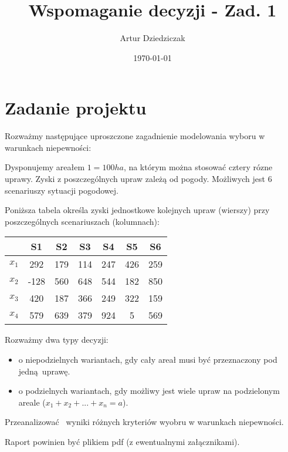 \documentclass{article}
\title{Wspomaganie decyzji - Zad. 1}
\author{Artur Dziedziczak}
\date{\today}
\begin{document}
\maketitle

\newpage

\section{Zadanie projektu}

Rozważmy następujące uproszczone zagadnienie modelowania wyboru w warunkach niepewności:

Dysponujemy areałem $1 = 100ha$, na którym można stosować cztery rózne uprawy. Zyski z poszczególnych upraw zależą od pogody. Możliwych jest 6 scenariuszy sytuacji pogodowej.

Poniższa tabela określa zyski jednostkowe kolejnych upraw (wierszy) przy poszczególnych scenariuszach (kolumnach):

\begin{table}[H]
  \begin{center}
    \begin{tabular}{ c |  c  c   c   c   c   c  }
      & S1 & S2 & S3 & S4 & S5 & S6 \\
      \hline
      $x_1$ & 292 & 179 & 114 & 247 & 426 & 259 \\
      $x_2$ & -128 & 560 & 648 & 544 & 182 & 850 \\
      $x_3$ & 420 & 187 & 366 & 249 & 322 & 159 \\
      $x_4$ & 579 & 639 & 379 & 924 & 5 & 569 \\
      \hline
    \end{tabular} 
  \end{center}
\end{table}

Rozważmy dwa typy decyzji:

\begin{itemize}
    \item o niepodzielnych wariantach, gdy cały areał musi być przeznaczony pod jedną uprawę.
    \item o podzielnych wariantach, gdy możliwy jest wiele upraw na podzielonym areale ($x_1 + x_2 + ... + x_n = a$).
\end{itemize}

Przeanalizować  wyniki różnych kryteriów wyobru w warunkach niepewności.

Raport powinien być plikiem pdf (z ewentualnymi załącznikami).
\end{document}
